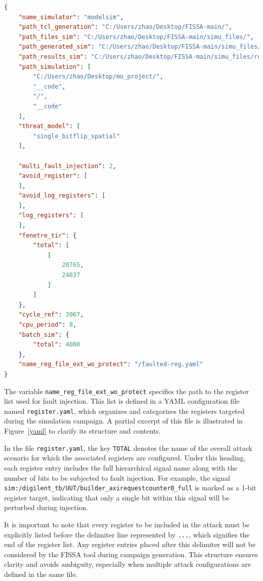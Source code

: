 \begin{lstlisting}[language=json,caption={config.json file},label={conf}]
{
    "name_simulator": "modelsim",
    "path_tcl_generation": "C:/Users/zhao/Desktop/FISSA-main/",
    "path_files_sim": "C:/Users/zhao/Desktop/FISSA-main/simu_files/",
    "path_generated_sim": "C:/Users/zhao/Desktop/FISSA-main/simu_files/generated_simulations/",
    "path_results_sim": "C:/Users/zhao/Desktop/FISSA-main/simu_files/results_simulations/",
    "path_simulation": [
        "C:/Users/zhao/Desktop/mo_project/",
        "__code",
        "/",
        "__code"
    ],
    "threat_model": [
        "single_bitflip_spatial"
    ],

    "multi_fault_injection": 2,
    "avoid_register": [
    ],
    "avoid_log_registers": [
    ],
    "log_registers": [
    ],
    "fenetre_tir": {
        "total": [
            [
                20765,
                24037
            ]
        ]
    },
    "cycle_ref": 3067,
    "cpu_period": 8,
    "batch_sim": {
        "total": 4000
    },
    "name_reg_file_ext_wo_protect": "/faulted-reg.yaml"
}
\end{lstlisting}

The variable \texttt{name\_reg\_file\_ext\_wo\_protect} specifies the path to the register list used for fault injection. This list is defined in a YAML configuration file named \texttt{register.yaml}, which organizes and categorizes the registers targeted during the simulation campaign. A partial excerpt of this file is illustrated in Figure~\ref{yaml} to clarify its structure and contents.

In the file \texttt{register.yaml}, the key \texttt{TOTAL} denotes the name of the overall attack scenario for which the associated registers are configured. Under this heading, each register entry includes the full hierarchical signal name along with the number of bits to be subjected to fault injection. For example, the signal \texttt{sim:/digilent\_tb/UUT/builder\_axirequestcounter0\_full} is marked as a 1-bit register target, indicating that only a single bit within this signal will be perturbed during injection.

It is important to note that every register to be included in the attack must be explicitly listed before the delimiter line represented by \texttt{...}, which signifies the end of the register list. Any register entries placed after this delimiter will not be considered by the FISSA tool during campaign generation. This structure ensures clarity and avoids ambiguity, especially when multiple attack configurations are defined in the same file.


